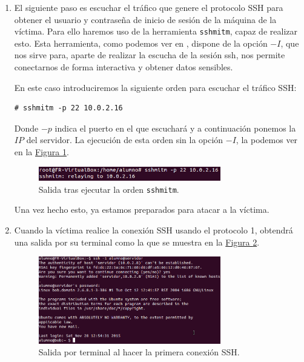 \documentclass[10pt,a4paper,spanish]{article}
\begin{document}
\begin{enumerate}
    \label{mitm_i}
    \item El siguiente paso es escuchar el tráfico que genere el protocolo SSH para obtener el usuario y contraseña de inicio de sesión de la máquina de la víctima. Para ello haremos uso de la herramienta \texttt{sshmitm}, capaz de realizar esto. Esta herramienta, como podemos ver en  \cite{sshmitm}, dispone de la opción $-I$, que nos sirve para, aparte de realizar la escucha de la sesión ssh, nos permite conectarnos de forma interactiva y obtener datos sensibles.

    En este caso introduciremos la siguiente orden para escuchar el tráfico SSH: 

\begin{verbatim}
# sshmitm -p 22 10.0.2.16
\end{verbatim}

    Donde $-p$ indica el puerto en el que escuchará y a continuación ponemos la $IP$ del servidor. La ejecución de esta orden sin la opción $-I$, la podemos ver en la \hyperref[ataque4]{Figura \ref*{ataque4}}.

    \begin{figure}[!h]
        \centering
        \includegraphics[width=0.75\textwidth]{ataque4}
        \caption{Salida tras ejecutar la orden \texttt{sshmitm}.}
        \label{ataque4}
    \end{figure}

    Una vez hecho esto, ya estamos preparados para atacar a la víctima.

    \item Cuando la víctima realice la conexión SSH usando el protocolo 1, obtendrá una salida por su terminal como la que se muestra en la \hyperref[ataque5]{Figura \ref*{ataque5}}. 

    \begin{figure}[!h]
        \centering
        \includegraphics[width=0.75\textwidth]{ataque5}
        \caption{Salida por terminal al hacer la primera conexión SSH.}
        \label{ataque5}
    \end{figure}


\end{enumerate}
\end{document}

